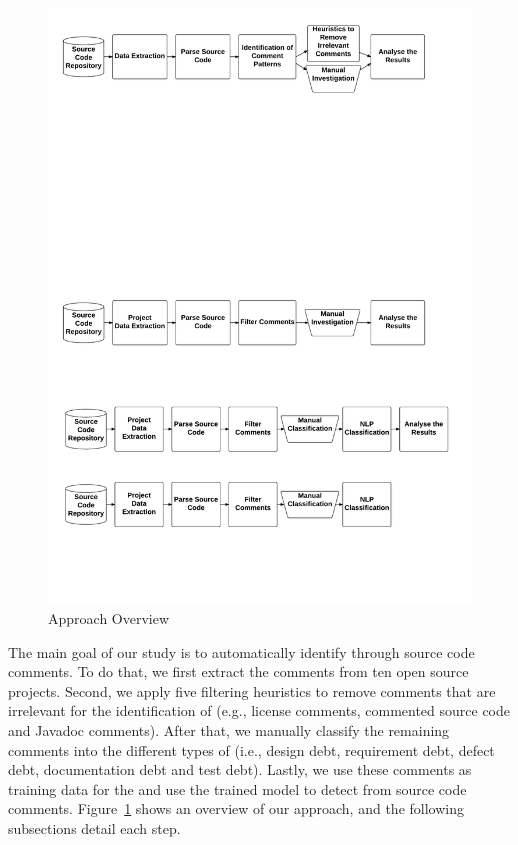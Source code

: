 \begin{figure}[thb!]
  \centering
  \includegraphics[width=1\textwidth]{figures/approach_reviwed.pdf}
  \vspace{-6mm}
  \caption{Approach Overview}
  \label{fig:approach}
  \vspace{-4mm}
\end{figure}

The main goal of our study is to automatically identify \SATD through source code comments. To do that, we first extract the comments from ten open source projects. Second, we apply five filtering heuristics to remove comments that are irrelevant for the identification of \SATD  (e.g., license comments, commented source code and Javadoc comments). After that, we manually classify the remaining comments into the different types of \SATD (i.e., design debt, requirement debt, defect debt, documentation debt and test debt). Lastly, we use these comments as training data for the  and use the trained model to detect \SATD from source code comments. Figure~\ref{fig:approach} shows an overview of our approach, and the following subsections detail each step.

